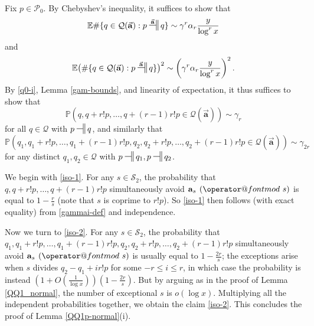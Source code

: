 \documentclass[12pt]{amsart}
\makeatletter
\numberwithin{equation}{section}  %
\theoremstyle{remark}
\theoremstyle{plain}
\numberwithin{equation}{section}
\newcommand{\E}{\mathbb{E}}  %
\newcommand{\PR}{\mathbb{P}}  %
\renewcommand{\pmod}[1]{\allowbreak\mkern7mu({\operator@font mod}\,\,#1)}
\renewcommand{\leq}{\leqslant}
\renewcommand{\(}{\left(}
\renewcommand{\)}{\right)}
\newcommand{\asym}{\sim}   %
\newcommand{\relr}{\nsdtstile{}{}} %
\newcommand{\relra}{\nsdtstile{}{\vect{\mathbf{a}}}} %
\newcommand{\vect}[1]{{\ensuremath{\vec{#1}}}}
\newcommand{\PP}{\mathcal{P}}
\newcommand{\QQ}{\mathcal{Q}}
\newcommand{\cS}{\mathcal{S}}
\makeatother
\begin{document}
Fix $p \in \PP_0$. By Chebyshev's inequality, it suffices to show that
\begin{equation*}
 \E \# \{ q \in \QQ(\vect{\mathbf{a}}): p \relra q \} \asym \gamma^r \alpha_r \frac{y}{\log^r x}
\end{equation*}
and
\begin{equation*}
 \E \big(\# \{ q \in \QQ(\vect{\mathbf{a}}): p \relra q \}\big)^2 \asym \left(\gamma^{r} \alpha_r \frac{y}{\log^r x}\right)^2.
\end{equation*} 
By \eqref{q0-i}, Lemma \ref{gam-bounds}, and linearity of expectation, it thus suffices to show that
\begin{equation}\label{iso-1}
\PR( q, q+r!p, \dots, q+(r-1)r!p \in \QQ(\vect{\mathbf{a}}) ) \asym \gamma_r
\end{equation}
for all $q \in \QQ$ with $p \relr q$, and similarly that
\begin{equation}\label{iso-2}
\PR( q_1, q_1+r!p, \dots, q_1+(r-1)r!p,q_2,q_2+r!p,\dots,q_2+(r-1)r!p \in \QQ(\vect{\mathbf{a}}) ) \asym \gamma_{2r}
\end{equation}
for any distinct $q_1,q_2 \in \QQ$ with $p \relr q_1,p \relr q_2$.

We begin with \eqref{iso-1}.  For any $s \in \cS_2$, the probability that $q,q+r!p,\dots,q+(r-1)r!p$ simultaneously avoid $\mathbf{a}_s \pmod{s}$ is equal to $1 - \frac{r}{s}$ (note that $s$ is coprime to $r!p$).  So \eqref{iso-1} then follows (with exact equality) from \eqref{gammai-def} and independence.

Now we turn to \eqref{iso-2}.  For any $s \in \cS_2$, the probability
that $q_1, q_1+r!p, \dots,
q_1+(r-1)r!p,q_2,q_2+r!p,\dots,q_2+(r-1)r!p$ simultaneously avoid
$\mathbf{a}_s \pmod{s}$ is usually equal to $1-\frac{2r}{s}$; the
exceptions arise when $s$ divides $q_2-q_1 + i r! p$ for some $-r \leq
i \leq r$, in which case the probability is instead $(1 +
O(\frac{1}{\log x})) (1-\frac{2r}{s})$.  But by arguing as in the
proof of Lemma \ref{QQ1_normal}, the number of exceptional $s$ is
$o(\log x)$.  Multiplying all the independent probabilities together,
we obtain the claim \eqref{iso-2}.  This concludes the proof of Lemma \ref{QQ1p-normal}(i).
\end{document}
